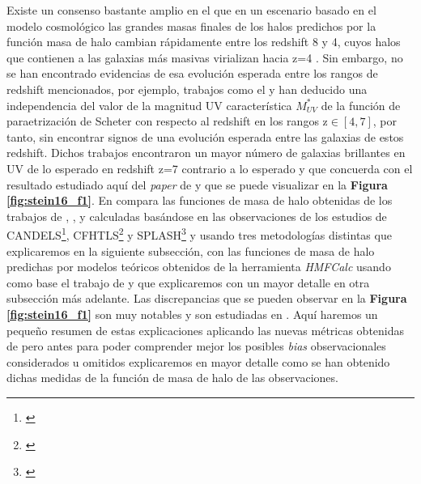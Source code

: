 Existe un consenso bastante amplio en el que en un escenario basado en el modelo cosmológico \lcdm las grandes masas finales de los halos predichos por la función masa de halo cambian rápidamente entre los redshift 8 y 4, cuyos halos que contienen a las galaxias más masivas virializan hacia z=4 \citep{steinhardt2016impossibly}. Sin embargo, no se han encontrado evidencias de esa evolución esperada entre los rangos de redshift mencionados, por ejemplo, trabajos como el \cite{finkelstein2015increasing} y \cite{finkelstein2015evolution} han deducido una independencia del valor de la magnitud UV característica $M^*_{UV}$ de la función de  paraetrización de Scheter con respecto al redshift en los rangos z$\in [4,7]$, por tanto, sin encontrar signos de una evolución esperada entre las galaxias de estos redshift. Dichos trabajos encontraron un mayor número de galaxias brillantes en UV de lo esperado en redshift z=7 contrario a lo esperado y que concuerda con el resultado estudiado aquí del \textit{paper} de \cite{steinhardt2016impossibly} y que se puede visualizar en la \textbf{Figura \ref{fig:stein16_f1}}. En \cite{steinhardt2016impossibly} compara las funciones de masa de halo obtenidas de los trabajos de \cite{hildebrandt2009cars}, \cite{steinhardt2014uniform}, \cite{bouwens2015reionization} y \cite{bouwens2015uv} calculadas basándose en las observaciones de los estudios de CANDELS\footnote{\cite{grogin2011candels}}, CFHTLS\footnote{\cite{hildebrandt2009cars}} y SPLASH\footnote{\cite{capak2012splash}} y usando tres metodologías distintas que explicaremos en la siguiente subsección, con las funciones de masa de halo predichas por modelos teóricos obtenidos de la herramienta \textit{HMFCalc} \citep{murray2013hmfcalc} usando como base el trabajo de \cite{sheth2001ellipsoidal} y que explicaremos con un mayor detalle en otra subsección más adelante. Las discrepancias que se pueden observar en la \textbf{Figura \ref{fig:stein16_f1}} son muy notables y son estudiadas en \cite{steinhardt2016impossibly}. Aquí haremos un pequeño resumen de estas explicaciones aplicando las nuevas métricas obtenidas de \cite{behroozi2019universemachine} pero antes para poder comprender mejor los posibles \textit{bias} observacionales considerados u omitidos explicaremos en mayor detalle como se han obtenido dichas medidas de la función de masa de halo de las observaciones.

